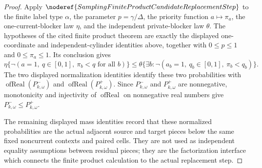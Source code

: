 \begin{proof}
Apply \(\noderef{SamplingFiniteProductCandidateReplacementStep}\) to the
finite label type \(\alpha\), the parameter \(p=\gamma/\Delta\), the priority
function \(a\mapsto\pi_a\), the one-current-blocker law \(\eta\), and the
independent private-blocker law \(\theta\).  The hypotheses of the cited
finite product theorem are exactly the displayed one-coordinate and
independent-cylinder identities above, together with \(0\le p\le1\) and
\(0\le\pi_a\le1\).  Its conclusion gives
\[
\eta\{\neg(a=1,\ q\in[0,1],\ \pi_b<q\text{ for all }b)\}
\le
\theta\{\exists b:
  \neg(a_b=1,\ q_b\in[0,1],\ \pi_b<q_b)\}.
\]
The two displayed normalization identities identify these two probabilities
with \(\operatorname{ofReal}(P^-_{k,\omega})\) and
\(\operatorname{ofReal}(P^+_{k,\omega})\).  Since
\(P^-_{k,\omega}\) and \(P^+_{k,\omega}\) are nonnegative,
monotonicity and injectivity of \(\operatorname{ofReal}\) on nonnegative
real numbers give \(P^-_{k,\omega}\le P^+_{k,\omega}\).

The remaining displayed mass identities record that these normalized
probabilities are the actual adjacent source and target pieces below the
same fixed noncurrent contexts and paired cells.  They are not used as
independent equality assumptions between residual pieces; they are the
factorization interface which connects the finite product calculation to the
actual replacement step.
\end{proof}
